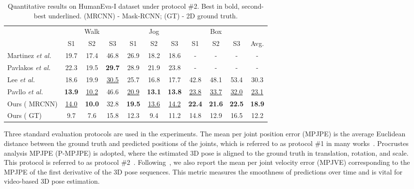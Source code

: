 \documentclass[journal]{IEEEtran}
\begin{document}
\begin{table}[ht]
   \centering
   \scriptsize
   \caption
   {
      Quantitative results on HumanEva-I dataset under protocol \#2. 
      Best in bold, second-best underlined.
      (MRCNN) - Mask-RCNN; 
      (GT) - 2D ground truth. 
   }
   \setlength{\tabcolsep}{0.95mm} 
   \begin{tabular}{@{}l|ccc|ccc|ccc|c@{}}
   \toprule[1pt]
   & \multicolumn{3}{c}{Walk} & \multicolumn{3}{c}{Jog} &
   \multicolumn{3}{c}{Box} \\
   & S1 & S2 & S3 & S1 & S2 & S3 & S1 & S2 & S3 & Avg. \\
   \midrule[0.5pt]

   Martinez \emph{et al.}~\cite{martinez2017simple} &19.7 &17.4 &46.8 &26.9 &18.2 &18.6 &- &- &- &-\\

   Pavlakos \emph{et al.}~\cite{pavlakos2017coarse} &22.3 &19.5 &\textbf{29.7} &28.9 &21.9 &23.8 &- &- &- &-\\

   Lee \emph{et al.}~\cite{lee2018propagating} &18.6 &19.9 &\underline{30.5} &25.7 &16.8 &17.7 &42.8 &48.1 &53.4 &30.3 \\

   Pavllo \emph{et al.}~\cite{pavllo20193d} &\textbf{13.9} &\underline{10.2} &46.6 &\underline{20.9} &\textbf{13.1} &\textbf{13.8} &\underline{23.8} &\underline{33.7} &\underline{32.0} &\underline{23.1} \\

   \midrule[0.5pt]
   Ours ( MRCNN) &\underline{14.0} &\textbf{10.0} &32.8 &\textbf{19.5} &\underline{13.6} &\underline{14.2} &\textbf{22.4} &\textbf{21.6} &\textbf{22.5} &\textbf{18.9} \\
   \midrule[0.5pt]

   Ours ( GT) &9.7 &7.6 &15.8 &12.3 &9.4 &11.2 &14.8 &12.9 &16.5 &12.2 \\
   \toprule[1pt]
   \end{tabular}
   \label{table:humaneva_eval}
\end{table} 

Three standard evaluation protocols are used in the experiments. 
The mean per joint position error (MPJPE) is the average Euclidean distance between the ground truth and predicted positions of the joints, which is referred to as protocol \#1 in many works~\cite{fang2018learning,kocabas2019self}. 
Procrustes analysis MPJPE (P-MPJPE) is adopted, where the estimated 3D pose is aligned to the ground truth in translation, rotation, and scale. 
This protocol is referred to as protocol \#2~\cite{martinez2017simple,rayat2018exploiting}.
Following~\cite{pavllo20193d,chen2021anatomy,wang2020motion}, we also report the mean per joint velocity error (MPJVE) corresponding to the MPJPE of the first derivative of the 3D pose sequences. 
This metric measures the smoothness of predictions over time and is vital for video-based 3D pose estimation.
\end{document}
